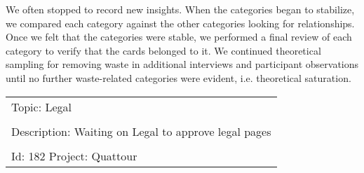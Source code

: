 We often stopped to record new insights. When the categories began to stabilize, we compared each category against the other categories looking for relationships. Once we felt that the categories were stable, we performed a final review of each category to verify that the cards belonged to it. We continued theoretical sampling for removing waste in additional interviews and participant observations until no further waste-related categories were evident, i.e. theoretical saturation. 


\begin{table}[t]
\renewcommand{\arraystretch}{1.5}
\centering
{}
\label{exampleRetroTopicl}
\begin{tabular}{|l|}
\hline
Topic: Legal \\ \\ Description: Waiting on Legal to approve legal pages \\ \\ Id: 182 Project: Quattour\\ \hline
\end{tabular}
\end{table}









